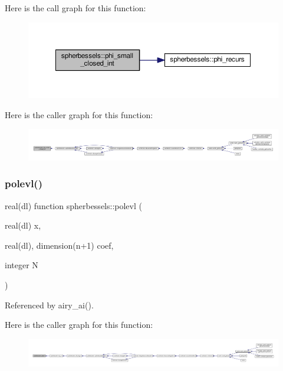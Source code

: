 Here is the call graph for this function\+:
\nopagebreak
\begin{figure}[H]
\begin{center}
\leavevmode
\includegraphics[width=350pt]{namespacespherbessels_a0d5dede9bff52decb1e7fb2d2df35d3a_cgraph}
\end{center}
\end{figure}
Here is the caller graph for this function\+:
\nopagebreak
\begin{figure}[H]
\begin{center}
\leavevmode
\includegraphics[width=350pt]{namespacespherbessels_a0d5dede9bff52decb1e7fb2d2df35d3a_icgraph}
\end{center}
\end{figure}
\mbox{\label{namespacespherbessels_afef9b0d68efd18edac5580591a39f7ba}} 
\subsubsection{\texorpdfstring{polevl()}{polevl()}}
{\footnotesize\ttfamily real(dl) function spherbessels\+::polevl (\begin{DoxyParamCaption}\item[{real(dl)}]{x,  }\item[{real(dl), dimension(n+1)}]{coef,  }\item[{integer}]{N }\end{DoxyParamCaption})\hspace{0.3cm}{\ttfamily [private]}}



Referenced by airy\+\_\+ai().

Here is the caller graph for this function\+:
\nopagebreak
\begin{figure}[H]
\begin{center}
\leavevmode
\includegraphics[width=350pt]{namespacespherbessels_afef9b0d68efd18edac5580591a39f7ba_icgraph}
\end{center}
\end{figure}
\mbox{\label{namespacespherbessels_ae89051535f9e9606be1ab046f5a77854}} 
